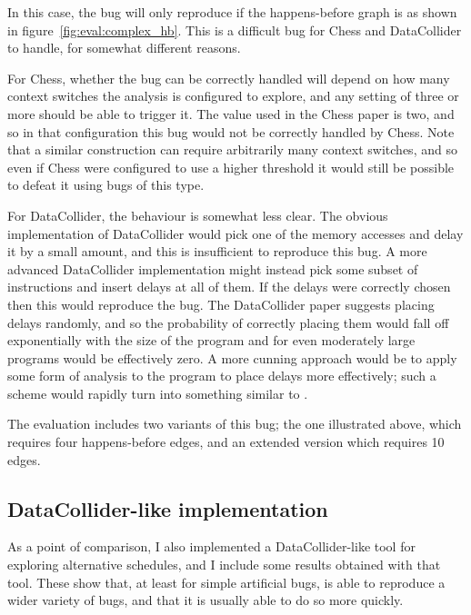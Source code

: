 In this case, the bug will only reproduce if the happens-before graph
is as shown in figure~\ref{fig:eval:complex_hb}.  This is a difficult
bug for Chess and DataCollider to handle, for somewhat different
reasons.

For Chess, whether the bug can be correctly handled will depend on how
many context switches the analysis is configured to explore, and any
setting of three or more should be able to trigger it.  The value used
in the Chess paper is two, and so in that configuration this bug would
not be correctly handled by Chess.  Note that a similar construction
can require arbitrarily many context switches, and so even if Chess
were configured to use a higher threshold it would still be possible
to defeat it using bugs of this type.

For DataCollider, the behaviour is somewhat less clear.  The obvious
implementation of DataCollider would pick one of the memory accesses
and delay it by a small amount, and this is insufficient to reproduce
this bug.  A more advanced DataCollider implementation might instead
pick some subset of instructions and insert delays at all of them.  If
the delays were correctly chosen then this would reproduce the bug.
The DataCollider paper suggests placing delays randomly, and so the
probability of correctly placing them would fall off exponentially
with the size of the program and for even moderately large programs
would be effectively zero.  A more cunning approach would be to apply
some form of analysis to the program to place delays more effectively;
such a scheme would rapidly turn into something similar to
{\technique}.

The evaluation includes two variants of this bug; the one illustrated
above, which requires four happens-before edges, and an extended
version which requires 10 edges.

\subsection{DataCollider-like implementation}


As a point of comparison, I also implemented a
DataCollider\needCite{}-like tool for exploring alternative schedules,
and I include some results obtained with that tool.  These show that,
at least for simple artificial bugs, {\technique} is able to reproduce
a wider variety of bugs, and that it is usually able to do so more
quickly.

